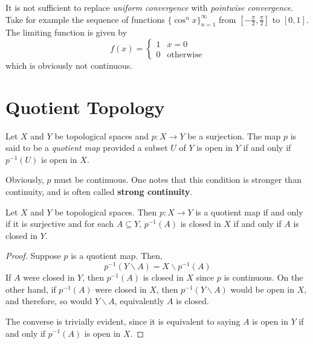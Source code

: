 \begin{mdframed}
    It is not sufficient to replace \textit{uniform convergence} with \textit{pointwise convergence}. Take for example the sequence of functions $\{\cos^nx\}_{n = 1}^\infty$ from $\left[-\frac{\pi}{2},\frac{\pi}{2}\right]$ to $[0,1]$. The limiting function is given by 
    \begin{equation*}
        f(x) = 
        \begin{cases}
            1 & x = 0\\
            0 & \text{otherwise}
        \end{cases}
    \end{equation*}
    which is obviously not continuous.
\end{mdframed}

\section{Quotient Topology}

\begin{definition}
    Let $X$ and $Y$ be topological spaces and $p:X\to Y$ be a surjection. The map $p$ is said to be a \textit{quotient map} provided a subset $U$ of $Y$ is open in $Y$ if and only if $p^{-1}(U)$ is open in $X$.
\end{definition}

Obviously, $p$ must be continuous. One notes that this condition is stronger than continuity, and is often called \textbf{strong continuity}.

\begin{lemma}
    Let $X$ and $Y$ be topological spaces. Then $p:X\to Y$ is a quotient map if and only if it is surjective and for each $A\subseteq Y$, $p^{-1}(A)$ is closed in $X$ if and only if $A$ is closed in $Y$.
\end{lemma}
\begin{proof}
    Suppose $p$ is a quotient map. Then, 
    \begin{equation*}
        p^{-1}(Y\backslash A) = X\backslash p^{-1}(A)
    \end{equation*}
    If $A$ were closed in $Y$, then $p^{-1}(A)$ is closed in $X$ since $p$ is continuous. On the other hand, if $p^{-1}(A)$ were closed in $X$, then $p^{-1}(Y\backslash A)$ would be open in $X$, and therefore, so would $Y\backslash A$, equivalently $A$ is closed.

    The converse is trivially evident, since it is equivalent to saying $A$ is open in $Y$ if and only if $p^{-1}(A)$ is open in $X$.
\end{proof}

